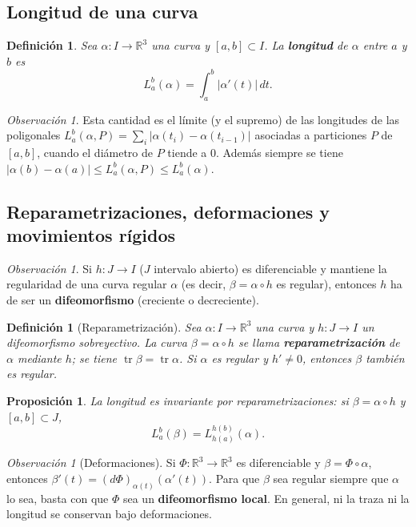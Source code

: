 \documentclass[11pt]{article}
\DeclareMathOperator{\tr}{tr}
\theoremstyle{plain}
\newtheorem{definicion}[teorema]{Definición}
\newtheorem{proposicion}[teorema]{Proposición}
\theoremstyle{definition}
\theoremstyle{remark}
\newtheorem{observacion}[teorema]{Observación}
\begin{document}
\subsection{Longitud de una curva}

\begin{definicion}
Sea $\alpha:I\to\mathbb{R}^3$ una curva y $[a,b]\subset I$. La \textbf{longitud} de $\alpha$ entre $a$ y $b$ es
\[
L_a^b(\alpha)=\int_a^b|\alpha'(t)|\,dt.
\]
\end{definicion}

\begin{observacion}
Esta cantidad es el límite (y el supremo) de las longitudes de las poligonales $L_a^b(\alpha,P)=\sum_i|\alpha(t_i)-\alpha(t_{i-1})|$ asociadas a particiones $P$ de $[a,b]$, cuando el diámetro de $P$ tiende a $0$. Además siempre se tiene $|\alpha(b)-\alpha(a)|\le L_a^b(\alpha,P)\le L_a^b(\alpha)$.
\end{observacion}

\subsection{Reparametrizaciones, deformaciones y movimientos rígidos}

\begin{observacion}
Si $h:J\to I$ ($J$ intervalo abierto) es diferenciable y mantiene la regularidad de una curva regular $\alpha$ (es decir, $\beta=\alpha\circ h$ es regular), entonces $h$ ha de ser un \textbf{difeomorfismo} (creciente o decreciente).
\end{observacion}

\begin{definicion}[Reparametrización]
Sea $\alpha:I\to\mathbb{R}^3$ una curva y $h:J\to I$ un difeomorfismo sobreyectivo. La curva $\beta=\alpha\circ h$ se llama \textbf{reparametrización} de $\alpha$ mediante $h$; se tiene $\tr\beta=\tr\alpha$. Si $\alpha$ es regular y $h'\neq0$, entonces $\beta$ también es regular.
\end{definicion}

\begin{proposicion}
La longitud es invariante por reparametrizaciones: si $\beta=\alpha\circ h$ y $[a,b]\subset J$,
\[
L_a^b(\beta)=L_{h(a)}^{h(b)}(\alpha).
\]
\end{proposicion}

\begin{observacion}[Deformaciones]
Si $\Phi:\mathbb{R}^3\to\mathbb{R}^3$ es diferenciable y $\beta=\Phi\circ\alpha$, entonces $\beta'(t)=(d\Phi)_{\alpha(t)}(\alpha'(t))$. Para que $\beta$ sea regular siempre que $\alpha$ lo sea, basta con que $\Phi$ sea un \textbf{difeomorfismo local}. En general, ni la traza ni la longitud se conservan bajo deformaciones.
\end{observacion}
\end{document}
